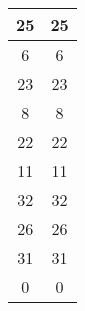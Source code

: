 \documentclass[a4paper]{article}
\begin{document}
\begin{CJK}{UTF8}{gbsn}
\begin{center}
\begin{tabular}{|c|c|}
		25   &  25  \\\hline
		6   &  6  \\\hline
		23   &  23  \\\hline
		8   &  8  \\\hline
		22   &  22  \\\hline
		11   &  11  \\\hline
		32   &  32  \\\hline
		26   &  26  \\\hline
		31   &  31  \\\hline
		0   &  0  \\\hline
	\end{tabular}
	\end{center}

\clearpage\end{CJK}

\printbibliography
\end{document}
